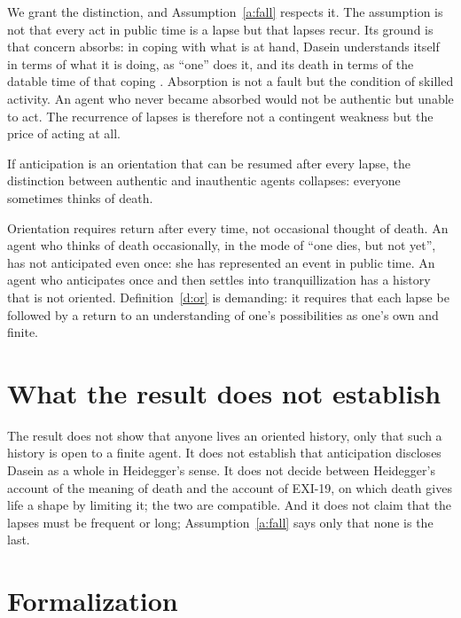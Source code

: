 \documentclass{situationist-preprint}
\begin{document}
\begin{reply}
We grant the distinction, and Assumption~\ref{a:fall} respects it. The assumption is not that every act in public time is a lapse but that lapses recur. Its ground is that concern absorbs: in coping with what is at hand, Dasein understands itself in terms of what it is doing, as \enquote{one} does it, and its death in terms of the datable time of that coping \citep{Dreyfus1991}. Absorption is not a fault but the condition of skilled activity. An agent who never became absorbed would not be authentic but unable to act. The recurrence of lapses is therefore not a contingent weakness but the price of acting at all.
\end{reply}

\begin{objection}[Triviality]
If anticipation is an orientation that can be resumed after every lapse, the distinction between authentic and inauthentic agents collapses: everyone sometimes thinks of death.
\end{objection}

\begin{reply}
Orientation requires return after every time, not occasional thought of death. An agent who thinks of death occasionally, in the mode of \enquote{one dies, but not yet}, has not anticipated even once: she has represented an event in public time. An agent who anticipates once and then settles into tranquillization has a history that is not oriented. Definition~\ref{d:or} is demanding: it requires that each lapse be followed by a return to an understanding of one's possibilities as one's own and finite.
\end{reply}

\section{What the result does not establish}

The result does not show that anyone lives an oriented history, only that such a history is open to a finite agent. It does not establish that anticipation discloses Dasein as a whole in Heidegger's sense. It does not decide between Heidegger's account of the meaning of death and the account of EXI-19, on which death gives life a shape by limiting it; the two are compatible. And it does not claim that the lapses must be frequent or long; Assumption~\ref{a:fall} says only that none is the last.

\section{Formalization}\label{s:formal}
\end{document}
